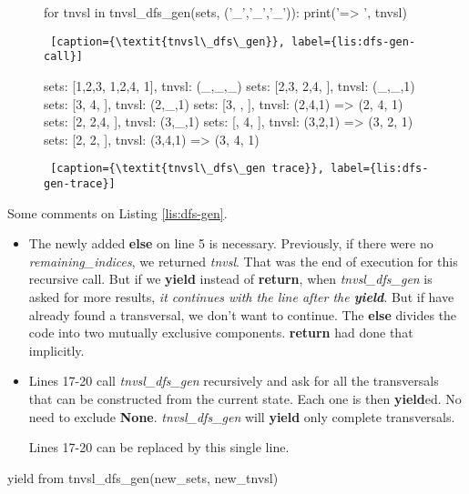 \begin{figure}[htb]
    \centering
\begin{minipage}[c]{0.45\textwidth}
\begin{python1}  
for tnvsl in tnvsl_dfs_gen(sets, ('_','_','_')):
    print('=> ', tnvsl)
\end{python1}\linv
\begin{lstlisting} [caption={\textit{tnvsl\_dfs\_gen}}, label={lis:dfs-gen-call}]
\end{lstlisting}
\end{minipage}\linv
\end{figure}


\begin{figure}[!ht]
    \centering
\begin{minipage}[c]{0.45\textwidth}
\begin{python1}  
sets: [{1,2,3}, {1,2,4}, {1}], tnvsl: (_,_,_)
  sets: [{2,3}, {2,4}, {}], tnvsl: (_,_,1)
    sets: [{3}, {4}, {}], tnvsl: (2,_,1)
      sets: [{3}, {}, {}], tnvsl: (2,4,1)
=>  (2, 4, 1)
    sets: [{2}, {2,4}, {}], tnvsl: (3,_,1)
      sets: [{}, {4}, {}], tnvsl: (3,2,1)
=>  (3, 2, 1)
      sets: [{2}, {2}, {}], tnvsl: (3,4,1)
=>  (3, 4, 1)
\end{python1}\linv
\begin{lstlisting} [caption={\textit{tnvsl\_dfs\_gen trace}}, label={lis:dfs-gen-trace}]
\end{lstlisting}\inv
\end{minipage}\linv
\end{figure}

Some comments on Listing \ref{lis:dfs-gen}.  %
\begin{itemize}
    \item The newly added \textbf{else} on line 5 is necessary. Previously, if there were no \textit{remaining\_indices}, we returned \textit{tnvsl}. That was the end of execution for this recursive call. But if we \textbf{yield} instead of \textbf{return}, when \textit{tnvsl\_dfs\_gen} is asked for more results, \textit{it continues with the line after the \textbf{yield}}. But if have already found a transversal, we don't want to continue. The \textbf{else} divides the code into two mutually exclusive components. \textbf{return} had done that implicitly.
    
    \item Lines 17-20 call \textit{tnvsl\_dfs\_gen} recursively and ask for all the transversals that can be constructed from the current state. Each one is then \textbf{yield}ed. No need to exclude \textbf{None}. \textit{tnvsl\_dfs\_gen} will \textbf{yield} only complete transversals. 
    
    \smallv
Lines 17-20 can be replaced by this single line.
\end{itemize}
\begin{center}
\begin{minipage}[c]{0.45\textwidth}
\begin{python1}
    yield from tnvsl_dfs_gen(new_sets, new_tnvsl)
\end{python1}
\end{minipage}   
\end{center}

